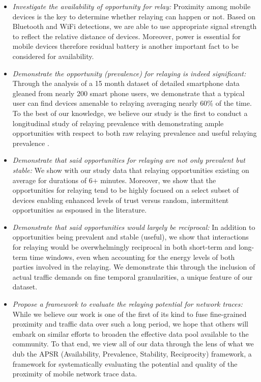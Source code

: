 \begin{itemize}
	\item \emph{Investigate the availability of opportunity for relay:} Proximity among mobile devices is the key to determine whether relaying can happen or not. Based on  Bluetooth and WiFi detections, we are able to use appropriate signal strength to reflect the relative distance of devices. Moreover, power is essential for mobile devices therefore residual battery is another important fact to be considered for availability.
	 
	\item \emph{Demonstrate the opportunity (prevalence) for relaying is indeed significant:} Through the analysis of a 15 month dataset of detailed smartphone data gleaned from nearly 200 smart phone users, we demonstrate that a typical user can find devices amenable to relaying averaging nearly 60\% of the time. To the best of our knowledge, we believe our study is the first to conduct a longitudinal study of relaying prevalence with demonstrating ample opportunities with respect to both raw relaying prevalence and useful relaying prevalence .  

	\item \emph{Demonstrate that said opportunities for relaying are not only prevalent but stable:} We show with our study data that relaying opportunities existing on average for durations of 6+ minutes. Moreover, we show that the opportunities for relaying tend to be highly focused on a select subset of devices enabling enhanced levels of trust versus random, intermittent opportunities as espoused in the literature.  

	\item \emph{Demonstrate that said opportunities would largely be reciprocal:} In addition to opportunities being prevalent and stable (useful), we show that interactions for relaying would be overwhelmingly reciprocal in both short-term and long-term time windows, even when accounting for the energy levels of both parties involved in the relaying.  We demonstrate this through the inclusion of actual traffic demands on fine temporal granularities, a unique feature of our dataset.  

	\item \emph{Propose a framework to evaluate the relaying potential for network traces:} While we believe our work is one of the first of its kind to fuse fine-grained proximity and traffic data over such a long period, we hope that others will embark on similar efforts to broaden the effective data pool available to the community.  To that end, we view all of our data through the lens of what we dub the APSR (Availability, Prevalence, Stability, Reciprocity) framework, a framework for systematically evaluating the potential and quality of the proximity of mobile network trace data.  
\end{itemize}

